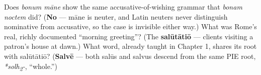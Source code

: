 \begin{tcolorbox}[breakable,colback=teal!4,colframe=teal!35!black,title={Before you move on}]
Does \emph{bonum māne} show the same accusative-of-wishing grammar that \emph{bonam noctem} did? (\textbf{No} — māne is neuter, and Latin neuters never distinguish nominative from accusative, so the case is invisible either way.) What was Rome's real, richly documented \textquotedblleft{}morning greeting\textquotedblright{}? (The \textbf{salūtātiō} — clients visiting a patron's house at dawn.) What word, already taught in Chapter 1, shares its root with salūtātiō? (\textbf{Salvē} — both salūs and salvus descend from the same PIE root, \emph{*solh\textsubscript{2}-}, \textquotedblleft{}whole.\textquotedblright{})
\end{tcolorbox}
